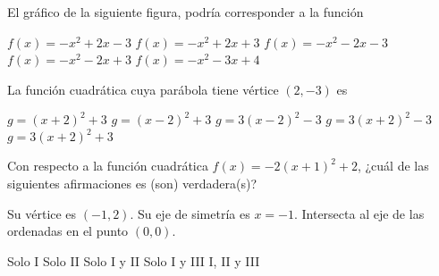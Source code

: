 \documentclass[sin nombre]{srs}
\begin{document}
\begin{preguntas}[after-item-skip=2cm]
\pregunta El gráfico de la siguiente figura, podría corresponder a la función
\begin{centrado}
\end{centrado}
\begin{vertical}
\alternativa $f\left(x\right) = -x^2 + 2x - 3$
\alternativa $f\left(x\right) = -x^2 + 2x + 3$
\alternativa $f\left(x\right) = -x^2 - 2x - 3$
\alternativa $f\left(x\right) = -x^2 - 2x + 3$
\alternativa $f\left(x\right) = -x^2 - 3x + 4$
\end{vertical}

\pregunta La función cuadrática cuya parábola tiene vértice $\left(2, -3\right)$ es
\begin{vertical}
\alternativa $g = \left(x + 2\right)^2 + 3$
\alternativa $g = \left(x - 2\right)^2 + 3$
\alternativa $g = 3\left(x - 2\right)^2 - 3$
\alternativa $g = 3\left(x + 2\right)^2 - 3$
\alternativa $g = 3\left(x + 2\right)^2 + 3$
\end{vertical}

\pregunta Con respecto a la función cuadrática $f\left(x\right) = -2\left(x + 1\right)^2 + 2$, ¿cuál de las siguientes afirmaciones es (son) verdadera(s)?
\begin{verticali}
\alternativa Su vértice es $\left(-1, 2\right)$.
\alternativa Su eje de simetría es $x = -1$.
\alternativa Intersecta al eje de las ordenadas en el punto $\left(0, 0\right)$.
\end{verticali}
\begin{vertical}
\alternativa Solo I
\alternativa Solo II
\alternativa Solo I y II
\alternativa Solo I y III
\alternativa I, II y III
\end{vertical}


\end{preguntas}
\end{document}
